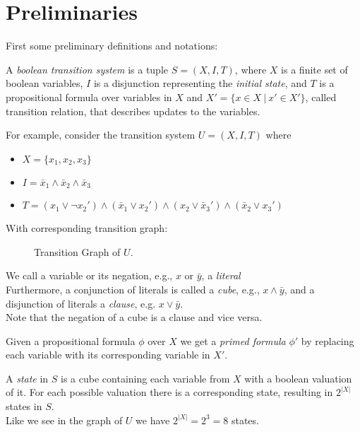 \documentclass[11pt, a4paper, BCOR=10mm, ngerman]{scrbook}
\begin{document}
\section{Preliminaries} \vspace{-5mm}
First some preliminary definitions and notations:  \par

A \textsl{boolean transition system} is a tuple $S = (X, I, T)$, where $X$ is a finite set of boolean variables, $I$ is a disjunction representing the \textsl{initial state}, and $T$ is a propositional formula over variables in $X$ and $X' = \{x \in X \ | \ x' \in X'\}$, called transition relation, that describes updates to the variables.
\par
For example, consider the transition system $U = (X, I, T)$ where
\begin{itemize}
	\item $ X= \{x_1, x_2, x_3\}$
	\item $I = \bar x_1 \land \bar x_2 \land \bar x_3$
	\item $T = (x_1 \lor \neg x_2' ) \land ( \bar x_1 \lor x_2') \land (x_2 \lor \bar x_3') \land ( \bar x_2 \lor x_3')$
\end{itemize}
\pagebreak
With corresponding transition graph:

\begin{figure}[H]
	\centering
	
	\caption{Transition Graph of $U$.}
	\label{ex1}
\end{figure}

We call a variable or its negation, e.g., $x \text{ or } \bar y$, a \textsl{literal} \\
Furthermore, a conjunction of literals is called a \textsl{cube}, e.g.,  $x \land \bar y$, and a disjunction of literals a \textsl{clause}, e.g. $x \lor \bar y$. \\
Note that the negation of a cube is a clause and vice versa. \par

Given a propositional formula $\phi$ over $X$ we get a \textsl{primed formula} $\phi'$ by replacing each variable with its corresponding variable in $X'$. \par

A \textsl{state} in $S$ is a cube containing each variable from $X$ with a boolean valuation of it. For each possible valuation there is a corresponding state, resulting in $2^{|X|}$ states in $S$. \\
Like we see in the graph of $U$ we have $2^{|X|} = 2^3 = 8$ states.
\end{document}

